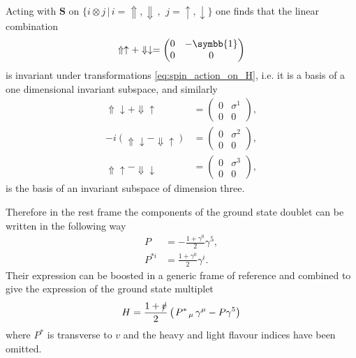 Acting with $\symbf{S}$ on $\{ \left. i \otimes j  \, \right\vert \, i = \Uparrow, \Downarrow \, , \, \ j = \uparrow, \downarrow\}$ one finds that the linear combination
\begin{equation}
  \Uparrow \uparrow + \Downarrow \downarrow = \begin{pmatrix} 0 & - \symbb{1} \\ 0 & 0 \end{pmatrix}
\end{equation}
is invariant under transformations \eqref{eq:spin_action_on_H}, i.e. it is a basis of a one dimensional invariant subspace, and similarly
\begin{subequations}
  \begin{align}
    \Uparrow \downarrow + \Downarrow \uparrow &= \begin{pmatrix} 0 & \sigma^1 \\ 0 & 0 \end{pmatrix} , \\
    -i \left( \Uparrow \downarrow - \Downarrow \uparrow \right) &= \begin{pmatrix} 0 & \sigma^2 \\ 0 & 0 \end{pmatrix} , \\
    \Uparrow \uparrow - \Downarrow \downarrow &= \begin{pmatrix} 0 & \sigma^3 \\ 0 & 0 \end{pmatrix} , 
  \end{align}
\end{subequations}
is the basis of an invariant subspace of dimension three.

Therefore in the rest frame the components of the ground state doublet can be written in the following way
\begin{subequations}
  \begin{align}
    P &= - \frac{1 + \gamma^0}{2} \gamma^5 ,\\
    P^{* i} &= \frac{1 + \gamma^0}{2} \gamma^i .
  \end{align}
\end{subequations}
Their expression can be boosted in a generic frame of reference and combined to give the expression of the ground state multiplet
\begin{equation}
  H =  \frac{1 + \slashed{v}}{2} \left( \left. P^* \right._\mu \gamma^\mu - P \gamma^5 \right)
  \label{eq:H_doublet}
\end{equation}
where $P^*$ is transverse to $v$ and the heavy and light flavour indices have been omitted.

